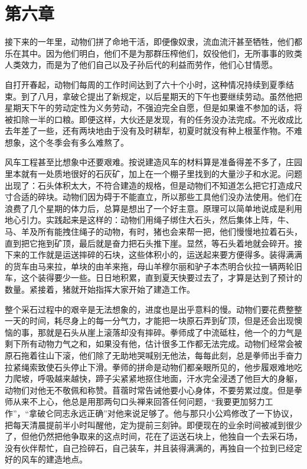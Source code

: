 \chapter{第六章}

接下来的一年里，动物们拼了命地干活，即便像奴隶，流血流汗甚至牺牲，他们都乐在其中。因为他们明白，他们不是为那群压榨他们，奴役他们，无所事事的败类人类效力，而是为了他们自己以及子孙后代的利益而劳作，他们心甘情愿。

自打开春起，动物们每周的工作时间达到了六十个小时，这种情况持续到夏季结束。到了八月，拿破仑提出了新规定，以后星期天的下午也要继续劳动。虽然他把星期天下午的劳动定性为义务劳动，不强迫完全自愿，但是如果谁不参加的话，将被扣除一半的口粮。即便这样，大伙还是发现，有的任务没办法完成。不光收成比去年差了一些，还有两块地由于没有及时耕犁，初夏时就没有种上根茎作物。不难想象，这个冬季会有多么难熬了。

风车工程甚至比想象中还要艰难。按说建造风车的材料算是准备得差不多了，庄园里本就有一处质地很好的石灰矿，加上在一个棚子里找到的大量沙子和水泥。问题出现了：石头体积太大，不符合建造的规格，但是动物们不知道怎么把它打造成尺寸合适的碎块。动物们因为碍于不能直立，所以那些工具他们没办法使用。他们在浪费了几个星期的体力后，总算是想出了一个好主意。原理可以简单地说成是利用地心引力。实践起来是这样的：动物们用绳子绑住大石头，然后集体上阵，牛、马、羊及所有能拽住绳子的动物，有时，猪也会来帮一把，他们慢慢地拉着石头，直到把它拖到矿顶，最后就是奋力把石头推下崖。显然，等石头着地就会碎开。接下来的工作就是运送摔碎的石块，这些体积小的，运送起来要方便得多。装得满满的货车由马来拉，单块的由羊来拖，母山羊穆尔丽和驴子本杰明合伙拉一辆两轮旧车，这个装得要少一些。日日地积累，直到夏天快要过去了，才算是达到了预计的数量。紧接着，猪就开始指挥大家开始了建造工作。

整个采石过程中的艰辛是无法想象的，进度也是出乎意料的慢。动物们要花费整整一天的时间，耗尽身上的每一分气力，才能把一块原石弄到矿顶，但是还会出现懊恼的事，那就是石头从崖上滚落却没有摔碎。拳师成了中流砥柱，他一个的力气是剩下所有动物力气之和，如果没有他，估计很多工作都无法完成。动物们经常会被原石拖着往山下滚，他们除了无助地哭喊别无他法，每每此刻，总是拳师出手奋力拉紧绳索致使石头停止下滑。拳师的拼命是动物们都亲眼所见的，他步履艰难地吃力爬坡，呼吸越来越快，蹄子尖紧紧地抠住地面，汗水完全浸透了他巨大的身躯，动物们对他无不敬佩和称赞。苜蓿时常告诫他要小心身体，不要劳累过度。但是拳师从来不上心，他总是用那两句口头禅来回答任何问题，“我要更加努力工作”，“拿破仑同志永远正确”对他来说足够了。他与那只小公鸡修改了一下协议，把每天清晨提前半小时叫醒他，定为提前三刻钟。即便现在的业余时间被减到很少了，但他仍然把他争取来的这点时间，花在了运送石块上，他独自一个去采石场，没有伙伴帮忙，自己捡碎石，自己装车，并且装得满满的，再独自一个拉到已经定好的风车的建造地点。


